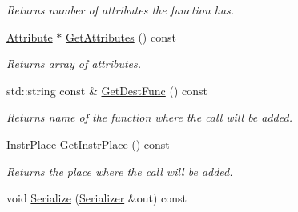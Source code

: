\begin{DoxyCompactItemize}
\begin{DoxyCompactList}\small\item\em Returns number of attributes the function has. \end{DoxyCompactList}\item 
\hypertarget{class_common_1_1_insert_function_call_request_aa74cefa1bcb949dafec52a1786be88ce}{\hyperlink{class_common_1_1_attribute}{Attribute} $\ast$ \hyperlink{class_common_1_1_insert_function_call_request_aa74cefa1bcb949dafec52a1786be88ce}{Get\-Attributes} () const }\label{class_common_1_1_insert_function_call_request_aa74cefa1bcb949dafec52a1786be88ce}

\begin{DoxyCompactList}\small\item\em Returns array of attributes. \end{DoxyCompactList}\item 
\hypertarget{class_common_1_1_insert_function_call_request_aa7bcff019a95a70e4c4e7816cc2e0050}{std\-::string const \& \hyperlink{class_common_1_1_insert_function_call_request_aa7bcff019a95a70e4c4e7816cc2e0050}{Get\-Dest\-Func} () const }\label{class_common_1_1_insert_function_call_request_aa7bcff019a95a70e4c4e7816cc2e0050}

\begin{DoxyCompactList}\small\item\em Returns name of the function where the call will be added. \end{DoxyCompactList}\item 
\hypertarget{class_common_1_1_insert_function_call_request_af1f4d5592bebe033b790c3bae1c801a0}{Instr\-Place \hyperlink{class_common_1_1_insert_function_call_request_af1f4d5592bebe033b790c3bae1c801a0}{Get\-Instr\-Place} () const }\label{class_common_1_1_insert_function_call_request_af1f4d5592bebe033b790c3bae1c801a0}

\begin{DoxyCompactList}\small\item\em Returns the place where the call will be added. \end{DoxyCompactList}\item 
\hypertarget{class_common_1_1_insert_function_call_request_af966bad75d6161fefd2683ff82504d74}{void \hyperlink{class_common_1_1_insert_function_call_request_af966bad75d6161fefd2683ff82504d74}{Serialize} (\hyperlink{class_common_1_1_serializer}{Serializer} \&out) const }\label{class_common_1_1_insert_function_call_request_af966bad75d6161fefd2683ff82504d74}


\end{DoxyCompactItemize}
